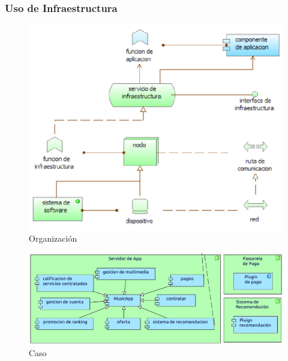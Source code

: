 \newpage

\subsubsection{Uso de Infraestructura}
\begin{figure}[h!]
	\centering
	\includegraphics[width=0.8\linewidth]{Desarrollo/ArquitecturaEmpresarial/Tecnologia/imgs/uso.PNG}
	\caption{Organización}
\end{figure}
\newpage
{}

\begin{figure}[h!]
	\centering
	\includegraphics[width=\linewidth]{Desarrollo/ArquitecturaEmpresarial/Tecnologia/imgs/uso.pdf}
	\caption{Caso}
\end{figure}

\newpage


